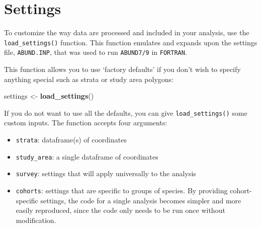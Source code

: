 \documentclass[
]{book}
\newenvironment{Shaded}{\begin{snugshade}}{\end{snugshade}}
\newcommand{\CommentTok}[1]{\textcolor[rgb]{0.56,0.35,0.01}{\textit{#1}}}
\newcommand{\ControlFlowTok}[1]{\textcolor[rgb]{0.13,0.29,0.53}{\textbf{#1}}}
\newcommand{\KeywordTok}[1]{\textcolor[rgb]{0.13,0.29,0.53}{\textbf{#1}}}
\newcommand{\NormalTok}[1]{#1}
\newcommand{\OperatorTok}[1]{\textcolor[rgb]{0.81,0.36,0.00}{\textbf{#1}}}
\newcommand{\StringTok}[1]{\textcolor[rgb]{0.31,0.60,0.02}{#1}}
\begin{document}
\begin{Shaded}
\end{Shaded}

\hypertarget{settings}{%
\chapter{Settings}\label{settings}}

To customize the way data are processed and included in your analysis, use the \texttt{load\_settings()} function. This function emulates and expands upon the settings file, \texttt{ABUND.INP}, that was used to run \texttt{ABUND7/9} in \texttt{FORTRAN}.

This function allows you to use `factory defaults' if you don't wish to specify anything special such as strata or study area polygons:

\begin{Shaded}
\begin{Highlighting}[]
\NormalTok{settings <-}\StringTok{ }\KeywordTok{load_settings}\NormalTok{()}
\end{Highlighting}
\end{Shaded}

If you do not want to use all the defaults, you can give \texttt{load\_settings()} some custom inputs. The function accepts four arguments:

\begin{itemize}
\item
  \texttt{strata}: dataframe(s) of coordinates
\item
  \texttt{study\_area}: a single dataframe of coordinates
\item
  \texttt{survey}: settings that will apply universally to the analysis
\item
  \texttt{cohorts}: settings that are specific to groups of species. By providing cohort-specific settings, the code for a single analysis becomes simpler and more easily reproduced, since the code only needs to be run once without modification.
\end{itemize}
\end{document}
